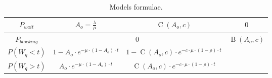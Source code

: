 \documentclass[
	12pt,
	twoside
]{book}
\begin{document}
\begin{landscape}
\begin{table}[H]
\begin{tabular}{|c|c|c|c|}
		$P_{wait}$ & $A_o = \frac {\lambda} {\mu}$ & $\operatorname{C}(A_o, c)$ & $0$ \\
		\hline
		$P_{blocking}$ & \multicolumn{2}{c|}{$0$} & $\operatorname{B}(A_o, c)$ \\
		\hline
		$P(W_q < t)$ & $1 - A_o \cdot e^{- \mu \cdot (1-A_o) \cdot t}$ & $1 - \operatorname{C}(A_o, c) \cdot e^{- c \cdot \mu \cdot (1-\rho) \cdot t}$ & \\
		\hline
		$P(W_q > t)$ & $A_o \cdot e^{- \mu \cdot (1-A_o) \cdot t}$ & $\operatorname{C}(A_o, c) \cdot e^{- c \cdot \mu \cdot (1-\rho) \cdot t}$ & \\
		\hline
	\end{tabular}
	\caption{
		\label{tab:summary_models_1}
		Models formulae.
	}
\end{table}

\end{landscape}
\end{document}

